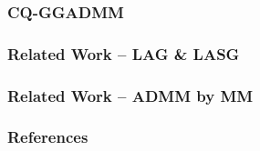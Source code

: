 
\begin{frame}
\frametitle{CQ-GGADMM}



\end{frame}


\begin{frame}
\frametitle{Related Work -- LAG \& LASG}



\end{frame}


\begin{frame}
\frametitle{Related Work -- ADMM by MM}



\end{frame}


\begin{frame}[allowframebreaks]
\frametitle{References}

{\footnotesize


}

\end{frame}



